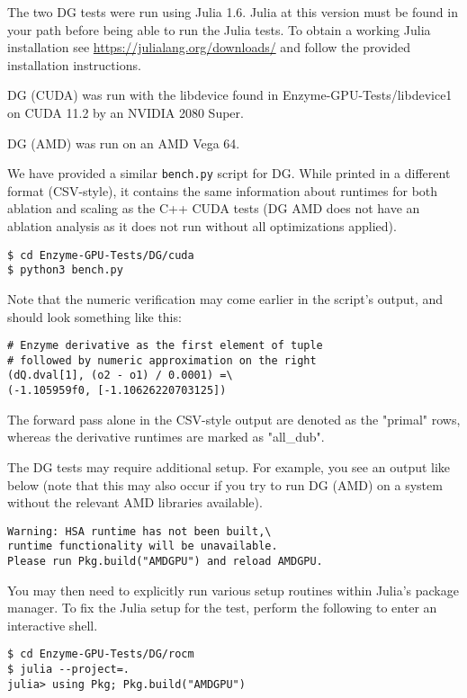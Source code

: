 The two DG tests were run using Julia 1.6. Julia at this version must be found in your path before being able to run the Julia tests. To obtain a working Julia installation see \url{https://julialang.org/downloads/} and follow the provided installation instructions.

DG (CUDA) was run with the libdevice found in Enzyme-GPU-Tests/libdevice1 on CUDA 11.2 by an NVIDIA 2080 Super.

DG (AMD) was run on an AMD Vega 64.

We have provided a similar \verb|bench.py| script for DG. While printed in a different format (CSV-style), it contains the same information about runtimes for both ablation and scaling as the C++ CUDA tests (DG AMD does not have an ablation analysis as it does not run without all optimizations applied).


\begin{verbatim}
$ cd Enzyme-GPU-Tests/DG/cuda
$ python3 bench.py
\end{verbatim}

Note that the numeric verification may come earlier in the script's output, and should look something like this:
\begin{verbatim}
# Enzyme derivative as the first element of tuple
# followed by numeric approximation on the right
(dQ.dval[1], (o2 - o1) / 0.0001) =\ 
(-1.105959f0, [-1.10626220703125])
\end{verbatim}

The forward pass alone in the CSV-style output are denoted as the "primal" rows, whereas the derivative runtimes are marked as "all\_dub".

The DG tests may require additional setup. For example, you see an output like below (note that this may also occur if you try to run DG (AMD) on a system without the relevant AMD libraries available).
\begin{verbatim}
Warning: HSA runtime has not been built,\
runtime functionality will be unavailable.
Please run Pkg.build("AMDGPU") and reload AMDGPU.
\end{verbatim}

You may then need to explicitly run various setup routines within Julia's package manager. To fix the Julia setup for the test, perform the following to enter an interactive shell.

\begin{verbatim}
$ cd Enzyme-GPU-Tests/DG/rocm
$ julia --project=.
julia> using Pkg; Pkg.build("AMDGPU")
\end{verbatim}


%